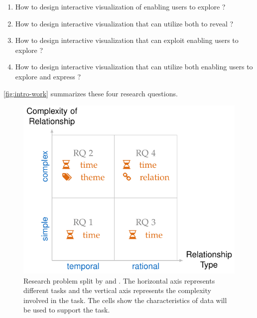 \begin{enumerate}
	\item How to design interactive visualization of  enabling users to explore ?
	
	\item How to design interactive visualization that can utilize both  to reveal ?	
	
	\item How to design interactive visualization that can exploit  enabling users to explore ?
	
	\item How to design interactive visualization that can utilize both  enabling users to explore and express ?				
\end{enumerate}

\autoref{fig:intro-work} summarizes these four research questions.

\begin{figure}[!htb]
	\centering
	\includegraphics{work}
	\caption{Research problem split by  and . The horizontal axis represents different tasks and the vertical axis represents the complexity involved in the  task. The cells show the characteristics of data will be used to support the task.}
	\label{fig:intro-work}
\end{figure}

